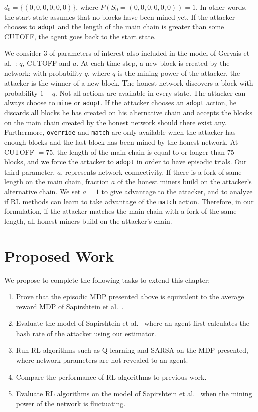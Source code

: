  $d_0 = \{(0, 0, 0, 0, 0, 0)\}$, where $P(S_0 = (0, 0, 0, 0, 0, 0)) = 1$. In other words, the start state assumes that no blocks have been mined yet. If the attacker chooses to \texttt{adopt} and the length of the main chain is greater than some CUTOFF, the agent goes back to the start state.

 We consider 3 of parameters of interest also included in the model of Gervais et al.~\cite{Gervais:2016}: $q$, CUTOFF and $a$. At each time step, a new block is created by the network: with probability $q$, where $q$ is the mining power of the attacker, the attacker is the winner of a new block. The honest network discovers a block with probability $1-q$. Not all actions are available in every state. The attacker can always choose to \texttt{mine} or \texttt{adopt}. If the attacker chooses an {\tt adopt} action, he discards all blocks he has created on his alternative chain and accepts the blocks on the main chain created by the honest network should there exist any. Furthermore, \texttt{override} and \texttt{match} are only available when the attacker has enough blocks and the last block has been mined by the honest network. At CUTOFF $= 75$, the length of the main chain is equal to or longer than 75 blocks, and we force the attacker to \texttt{adopt} in order to have episodic trials. Our third parameter, $a$, represents network connectivity. If there is a fork of same length on the main chain, fraction $a$ of the honest miners build on the attacker's alternative chain. We set $a=1$ to give advantage to the attacker, and to analyze if RL methods can learn to take advantage of the \texttt{match} action. Therefore, in our formulation, if the attacker matches the main chain with a fork of the same length, all honest miners build on the attacker's chain. 

\section{Proposed Work}\label{section:selfishRL-proposed-work}
We propose to complete the following tasks to extend this chapter:
\begin{enumerate}
\item Prove that the episodic MDP presented above is equivalent to the average reward MDP of Sapirshtein et al.~\cite{sapirshtein:2015}.
\item Evaluate the model of Sapirshtein et al.~\cite{sapirshtein:2015} where an agent first calculates the hash rate of the attacker using our estimator.
\item Run RL algorithms such as Q-learning and SARSA on the MDP presented, where network parameters are not revealed to an agent.
\item Compare the performance of RL algorithms to previous work.
\item Evaluate RL algorithms on the model of Sapirshtein et al.~\cite{sapirshtein:2015} when the mining power of the network is fluctuating.
\end{enumerate}


